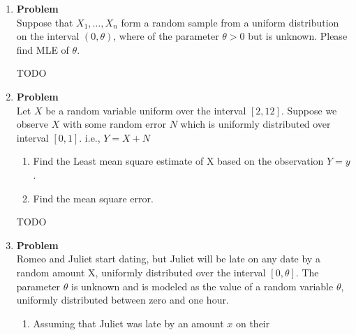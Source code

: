 \documentclass[12pt]{article}
\newenvironment{Ex}{\textbf{Problem}\vspace{.75em}\\}{}
\begin{document}
\begin{enumerate}
\begin{Ex}
    \begin{enumerate}
    \item Based on $N$, the number of drives tested up to and
      including the first failure, design a MAP test.
    \item Calculate the probability of ``false alarm'' and the
      probability of ``missed detection''.
    \item Based on this, calculate the probability of detection error
      $P_e$.
    \end{enumerate}
    \begin{solution} \hfill
      {\huge \color{red} TODO}
    \end{solution}
  \end{Ex}
\item 
  \begin{Ex}
    Suppose that $X_1,\ldots,X_n$ form a random sample from a uniform
    distribution on the interval $(0,\theta)$, where of the parameter
    $\theta > 0$ but is unknown. Please find MLE of $\theta$.
    \begin{solution} \hfill
      {\huge \color{red} TODO}
    \end{solution}
  \end{Ex}
\item 
  \begin{Ex}
    Let $X$ be a random variable uniform over the interval $[2,
    12]$. Suppose we observe $X$ with some random error $N$ which is
    uniformly distributed over interval $[0,1]$. i.e., $Y =X+N$
    \begin{enumerate}
    \item Find the Least mean square estimate of X based on the
      observation $Y = y$.
    \item Find the mean square error.
    \end{enumerate}
    \begin{solution} \hfill
      {\huge \color{red} TODO}
    \end{solution}
  \end{Ex}
\item 
  \begin{Ex}
    Romeo and Juliet start dating, but Juliet will be late on any date
    by a random amount X, uniformly distributed over the interval $[0,
    \theta]$. The parameter $\theta$ is unknown and is modeled as the
    value of a random variable $\theta$, uniformly distributed between
    zero and one hour.
    \begin{enumerate}
    \item Assuming that Juliet was late by an amount $x$ on their

\end{enumerate}
\end{Ex}
\end{enumerate}
\end{document}
